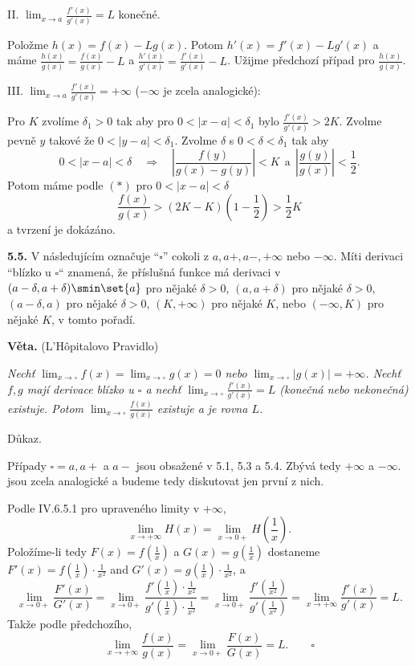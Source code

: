 \documentclass[12pt]{article}
\begin{document}
{\smallskip

II. $\lim_{x\to a}\frac{f'(x)}{g'(x)}=L$ konečné.

Položme $h(x)=f(x)-Lg(x)$. Potom $h'(x)=f'(x)-Lg'(x)$ a máme
$\frac{h(x)}{g(x)}=\frac{f(x)}{g(x)}-L$ a $\frac{h'(x)}{g'(x)}=
\frac{f'(x)}{g'(x)}-L$. Užijme předchozí případ pro $\frac{h(x)}{g(x)}$.

\smallskip

III. $\lim_{x\to a}\frac{f'(x)}{g'(x)}=+\infty$ ($-\infty$ je zcela analogické):

Pro $K$ zvolíme $\delta_1>0$ tak aby pro $0<|x-a|<\delta_1$ bylo
$\frac{f'(x)}{g'(x)}>2K$. Zvolme pevn\v e $y$ takov\'e \v ze $0<|y-a|<\delta_1$. Zvolme $\delta$ s $0<\delta<\delta_1$ tak aby
$$
0<|x-a|<\delta\quad\Rightarrow\quad \left|\frac{f(y)}{g(x)-g(y)}\right|<K\ \ \text{a}\ \ \left|\frac{g(y)}{g(x)}\right|<\frac12.
$$
Potom máme podle $(*)$ pro $0<|x-a|<\delta$
$$
\frac{f(x)}{g(x)}>(2K-K)(1-\frac12)>\frac12 K
$$ 
a tvrzení je dokázáno. \sq

\bigskip

{\bf 5.5.} V následujícím označuje ``$\square$'' cokoli z $a,a+,a-,+\infty$ nebo $-\infty$. Míti derivaci ``blízko u $\square$`` znamená, že příslušná funkce má derivaci
v $(a-\delta,a+\delta)\smin\set{a}$ pro nějaké $\delta>0$, 
$(a,a+\delta)$ pro nějaké $\delta>0$, $(a-\delta,a)$ pro nějaké $\delta>0$,
$(K,+\infty)$ pro nějaké $K$, nebo $(-\infty,K)$ pro nějaké $K$, v tomto pořadí.

\medskip

{\bf Věta.} (L'H\^{o}pitalovo Pravidlo) {\em Nechť $\lim_{x\to\square}f(x)=
\lim_{x\to\square}g(x)=0$ nebo $\lim_{x\to\square}|g(x)|=+\infty$. Nechť
$f,g$ mají derivace blízko u $\square$  a nechť $\lim_{x\to\square}\frac{f'(x)}{g'(x)}=L$ (konečná nebo nekonečná) existuje. Potom 
$\lim_{x\to\square}\frac{f(x)}{g(x)}$ existuje a je rovna $L$.

Důkaz.} Případy $\square=a,a+$ a  $a-$ jsou obsažené v 5.1, 5.3 a 5.4. Zbývá tedy $+\infty$ a $-\infty$. jsou zcela analogické a budeme tedy diskutovat jen první z nich.

Podle IV.6.5.1 pro upraveného limity v $+\infty$, 
$$
\lim_{x\to+\infty}H(x)= \lim_{x\to 0+}H(\frac{1}{x}).
$$
Položíme-li tedy $F(x)=f(\frac1{x})$ a $G(x)=g(\frac1{x})$ dostaneme
$F'(x)=f(\frac1{x})\cdot\frac{1}{x^2}$ and $G'(x)=g(\frac1{x})\cdot\frac{1}{x^2}$, 
a
$$
\lim_{x\to 0+}\frac{F'(x)}{G'(x)}=
\lim_{x\to 0+}\frac{f'(\frac{1}{x})\cdot\frac{1}{x^2}}{g'(\frac{1}{x})\cdot\frac{1}{x^2}}
=\lim_{x\to 0+}\frac{f'(\frac{1}{x^2})}{g'(\frac{1}{x^2})}=\lim_{x\to +\infty}\frac{f'(x)}{g'(x)}=L.
$$
Takže podle předchozího,
$$
\lim_{x\to+\infty}\frac{f(x)}{g(x)}=\lim_{x\to 0+}\frac{F(x)}{G(x)}=L. \quad\quad\square
$$

}
\end{document}
